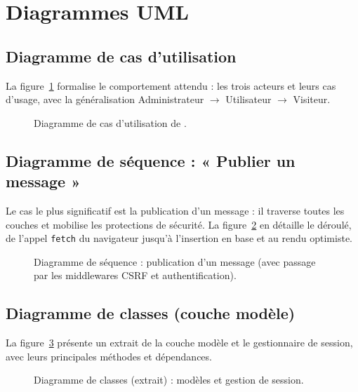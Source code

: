 \section{Diagrammes UML}
\label{sec:uml}

\subsection{Diagramme de cas d'utilisation}

La figure~\ref{fig:usecase} formalise le comportement attendu : les trois acteurs et leurs cas
d'usage, avec la généralisation Administrateur $\rightarrow$ Utilisateur $\rightarrow$ Visiteur.

\begin{figure}[ht]
\centering
\resizebox{0.92\textwidth}{!}{}
\caption{Diagramme de cas d'utilisation de \projet{}.}
\label{fig:usecase}
\end{figure}

\subsection{Diagramme de séquence : « Publier un message »}

Le cas le plus significatif est la publication d'un message : il traverse toutes les couches et
mobilise les protections de sécurité. La figure~\ref{fig:sequence} en détaille le déroulé, de
l'appel \texttt{fetch} du navigateur jusqu'à l'insertion en base et au rendu optimiste.

\begin{figure}[ht]
\centering
\resizebox{\textwidth}{!}{}
\caption{Diagramme de séquence : publication d'un message (avec passage par les middlewares
CSRF et authentification).}
\label{fig:sequence}
\end{figure}

\subsection{Diagramme de classes (couche modèle)}

La figure~\ref{fig:classes} présente un extrait de la couche modèle et le gestionnaire de
session, avec leurs principales méthodes et dépendances.

\begin{figure}[ht]
\centering
\resizebox{\textwidth}{!}{}
\caption{Diagramme de classes (extrait) : modèles et gestion de session.}
\label{fig:classes}
\end{figure}

